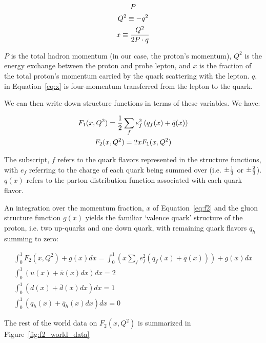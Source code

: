 \begin{gather}
  P \label{eq:P}\\
  Q^2 \equiv -q^2 \label{eq:big_q_sq}\\
    x \equiv { Q^2 \over {2P\cdot q} } \label{eq:x}
\end{gather}

$P$ is the total hadron momentum (in our case, the proton's momentum), $Q^2$ is
the energy exchange between the proton and probe lepton, and $x$ is the fraction
of the total proton's momentum carried by the quark scattering with the lepton.
$q$, in Equation~\ref{eq:x} is four-momentum transferred from the lepton to the
quark. 

We can then write down structure functions in terms of these variables. We have:

\begin{gather}
  F_1(x,Q^2) = {1 \over 2}\sum_f e_f^2 \left(q_f(x)+\bar{q}(x)\right)
  \label{eq:f1} \\
  F_2(x,Q^2) = 2xF_1(x,Q^2)\label{eq:f2}
\end{gather}

The subscript, $f$ refers to the quark flavors represented in the structure
functions, with $e_f$ referring to the charge of each quark being summed over
(i.e. ${\pm}{1\over3}$ or ${\pm}{2\over3}$). $q(x)$ refers to the parton
distribution function associated with each quark flavor. 

An integration over the momentum fraction, $x$ of Equation~\ref{eq:f2} and the
gluon structure function $g(x)$ yields the familiar `valence quark' structure of
the proton, i.e. two up-quarks and one down quark, with remaining quark flavors
$q_h$ summing to zero:

\begin{gather}
	\int_0^1 F_2(x,Q^2) + g(x) dx 
	= \int_0^1 
	\left(
		x\sum_f e_f^2 \left(q_f(x)+\bar{q}(x)\right) 
	\right) 
	+ g(x) dx \label{eq:f2_int_1} \\
	\int_0^1 \left(u(x)+\bar{u}(x) dx \right) dx = 2  \label{eq:up_quark_valence} \\
	\int_0^1 \left(d(x)+\bar{d}(x) dx \right) dx = 1  \label{eq:down_quark_valence} \\
	\int_0^1 \left(q_h(x)+\bar{q}_h(x) dx \right) dx = 0 \label{eq:other_quark_valence}
\end{gather}

The rest of the world data on $F_2(x,Q^2)$ is summarized in
Figure~\ref{fig:f2_world_data}

